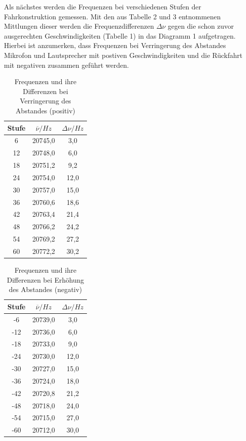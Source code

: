 Als nächstes werden die Frequenzen bei verschiedenen Stufen der Fahrkonstruktion gemessen.
Mit den aus Tabelle 2 und 3 entnommenen Mittlungen dieser werden die Frequenzdifferenzen $\Delta\nu$
gegen die schon zuvor ausgerechten Geschwindigkeiten (Tabelle 1) in das Diagramm 1 aufgetragen.
Hierbei ist anzumerken, dass Frequenzen bei Verringerung des Abstandes Mikrofon und Lautsprecher
mit postiven Geschwindigkeiten und die Rückfahrt mit negativen zusammen geführt werden.
\\
\begin{table}
\centering
 \caption{Frequenzen und ihre Differenzen bei Verringerung des Abstandes (positiv)}
\label{tab:pos}
\begin{tabular}{ c c c }
\toprule
Stufe & $\overline{\nu}/Hz$ & $\Delta\nu/Hz$ \\
\midrule
6 & 20745,0 & 3,0 \\
12 & 20748,0 & 6,0 \\
18 & 20751,2 & 9,2\\
24 & 20754,0 & 12,0\\
30 & 20757,0 & 15,0\\
36 & 20760,6 & 18,6\\
42 & 20763,4 & 21,4\\
48 & 20766,2 & 24,2\\
54 & 20769,2 & 27,2\\
60 & 20772,2 & 30,2\\
\bottomrule
\end{tabular}
\end{table}
\begin{table}
\centering
 \caption{Frequenzen und ihre Differenzen bei Erhöhung des Abstandes (negativ)}
\label{tab:neg}
\begin{tabular}{ c c c }
\toprule
Stufe & $\overline{\nu}/Hz$ & $\Delta\nu/Hz$ \\
\midrule
-6 & 20739,0 & 3,0 \\
-12 & 20736,0 & 6,0 \\
-18 & 20733,0 & 9,0\\
-24 & 20730,0 & 12,0\\
-30 & 20727,0 & 15,0\\
-36 & 20724,0 & 18,0\\
-42 & 20720,8 & 21,2\\
-48 & 20718,0 & 24,0\\
-54 & 20715,0 & 27,0\\
-60 & 20712,0 & 30,0\\
\bottomrule
\end{tabular}
\end{table}
